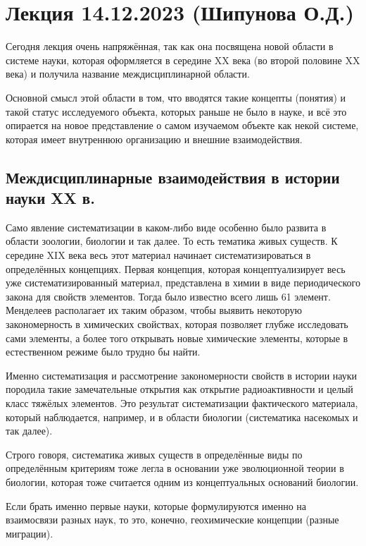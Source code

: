 \documentclass[main.tex]{subfiles}
\begin{document}
\section{Лекция 14.12.2023 (Шипунова О.Д.)}


Сегодня лекция очень напряжённая, так как она посвящена новой области в системе науки, которая оформляется в середине XX века (во второй половине XX века) и получила название междисциплинарной области.

Основной смысл этой области в том, что вводятся такие концепты (понятия) и такой статус исследуемого объекта, которых раньше не было в науке, и всё это опирается на новое представление о самом изучаемом объекте как некой системе, которая имеет внутреннюю организацию и внешние взаимодействия.

\subsection{Междисциплинарные взаимодействия в истории науки XX в.}


Само явление систематизации в каком-либо виде особенно было развита в области зоологии, биологии и так далее.
То есть тематика живых существ.
К середине XIX века весь этот материал начинает систематизироваться в определённых концепциях.
Первая концепция, которая концептуализирует весь уже систематизированный материал, представлена в химии в виде периодического закона для свойств элементов.
Тогда было известно всего лишь 61 элемент.
Менделеев располагает их таким образом, чтобы выявить некоторую закономерность в химических свойствах, которая позволяет глубже исследовать сами элементы, а более того открывать новые химические элементы, которые в естественном режиме было трудно бы найти.

Именно систематизация и рассмотрение закономерности свойств в истории науки породила такие замечательные открытия как открытие радиоактивности и целый класс тяжёлых элементов.
Это результат систематизации фактического материала, который наблюдается, например, и в области биологии (систематика насекомых и так далее).

Строго говоря, систематика живых существ в определённые виды по определённым критериям тоже легла в основании уже эволюционной теории в биологии, которая тоже считается одним из концептуальных оснований биологии.

Если брать именно первые науки, которые формулируются именно на взаимосвязи разных наук, то это, конечно, геохимические концепции (разные миграции).
\end{document}
